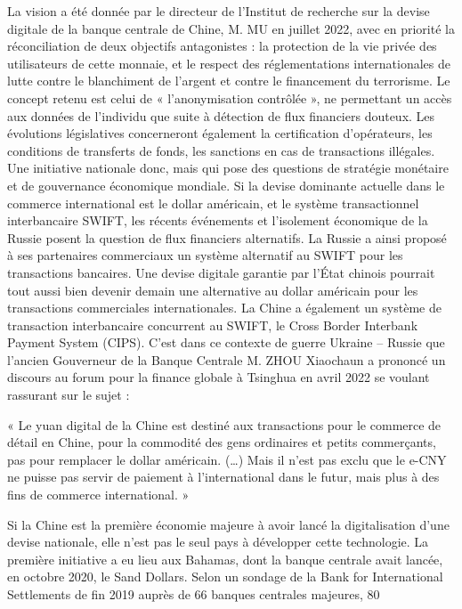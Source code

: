 \documentclass[a4paper]{article}
\begin{document}
La vision a été donnée par le directeur de l'Institut de recherche sur la devise digitale de la banque centrale de Chine, M. MU en juillet 2022, avec en priorité la réconciliation de deux objectifs antagonistes : la protection de la vie privée des utilisateurs de cette monnaie, et le respect des réglementations internationales de lutte contre le blanchiment de l’argent et contre le financement du terrorisme. Le concept retenu est celui de « l’anonymisation contrôlée », ne permettant un accès aux données de l’individu que suite à détection de flux financiers douteux. Les évolutions législatives concerneront également la certification d’opérateurs, les conditions de transferts de fonds, les sanctions en cas de transactions illégales. Une initiative nationale donc, mais qui pose des questions de stratégie monétaire et de gouvernance économique mondiale. Si la devise dominante actuelle dans le commerce international est le dollar américain, et le système transactionnel interbancaire SWIFT, les récents événements et l’isolement économique de la Russie posent la question de flux financiers alternatifs. La Russie a ainsi proposé à ses partenaires commerciaux un système alternatif au SWIFT pour les transactions bancaires. Une devise digitale garantie par l’État chinois pourrait tout aussi bien devenir demain une alternative au dollar américain pour les transactions commerciales internationales. La Chine a également un système de transaction interbancaire concurrent au SWIFT, le Cross Border Interbank Payment System (CIPS). C’est dans ce contexte de guerre Ukraine – Russie que l’ancien Gouverneur de la Banque Centrale M. ZHOU Xiaochaun a prononcé un discours au forum pour la finance globale à Tsinghua en avril 2022 se voulant rassurant sur le sujet : 

« Le yuan digital de la Chine est destiné aux transactions pour le commerce de détail en Chine, pour la commodité des gens ordinaires et petits commerçants, pas pour remplacer le dollar américain. (…) Mais il n’est pas exclu que le e-CNY ne puisse pas servir de paiement à l’international dans le futur, mais plus à des fins de commerce international. » 

Si la Chine est la première économie majeure à avoir lancé la digitalisation d’une devise nationale, elle n’est pas le seul pays à développer cette technologie. La première initiative a eu lieu aux Bahamas, dont la banque centrale avait lancée, en octobre 2020, le Sand Dollars. Selon un sondage de la Bank for International Settlements de fin 2019 auprès de 66 banques centrales majeures, 80 %
\end{document}

